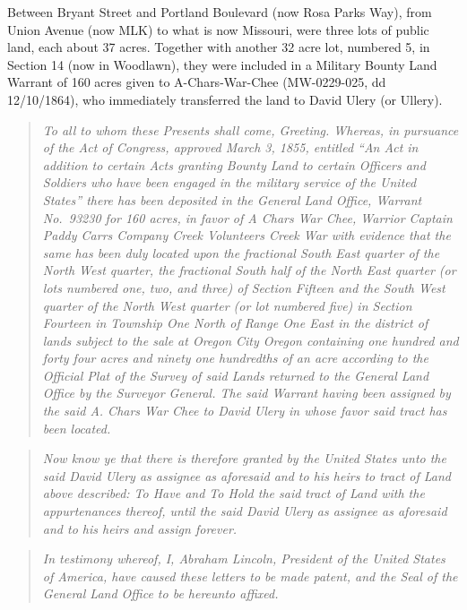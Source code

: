 \documentclass[
  12pt,
]{book}
\begin{document}
Between Bryant Street and Portland Boulevard (now Rosa Parks Way), from Union Avenue (now MLK) to what is now Missouri, were three lots of public land, each about 37 acres. Together with another 32 acre lot, numbered 5, in Section 14 (now in Woodlawn), they were included in a Military Bounty Land Warrant of 160 acres given to A-Chars-War-Chee (MW-0229-025, dd 12/10/1864), who immediately transferred the land to David Ulery (or Ullery).

\begin{quote}
\emph{To all to whom these Presents shall come, Greeting. Whereas, in pursuance of the Act of Congress, approved March 3, 1855, entitled ``An Act in addition to certain Acts granting Bounty Land to certain Officers and Soldiers who have been engaged in the military service of the United States'' there has been deposited in the General Land Office, Warrant No.~93230 for 160 acres, in favor of A Chars War Chee, Warrior Captain Paddy Carrs Company Creek Volunteers Creek War with evidence that the same has been duly located upon the fractional South East quarter of the North West quarter, the fractional South half of the North East quarter (or lots numbered one, two, and three) of Section Fifteen and the South West quarter of the North West quarter (or lot numbered five) in Section Fourteen in Township One North of Range One East in the district of lands subject to the sale at Oregon City Oregon containing one hundred and forty four acres and ninety one hundredths of an acre according to the Official Plat of the Survey of said Lands returned to the General Land Office by the Surveyor General. The said Warrant having been assigned by the said A. Chars War Chee to David Ulery in whose favor said tract has been located. }
\end{quote}

\begin{quote}
\emph{Now know ye that there is therefore granted by the United States unto the said David Ulery as assignee as aforesaid and to his heirs to tract of Land above described: To Have and To Hold the said tract of Land with the appurtenances thereof, until the said David Ulery as assignee as aforesaid and to his heirs and assign forever.}
\end{quote}

\begin{quote}
\emph{In testimony whereof, I, Abraham Lincoln, President of the United States of America, have caused these letters to be made patent, and the Seal of the General Land Office to be hereunto affixed.}
\end{quote}
\end{document}
